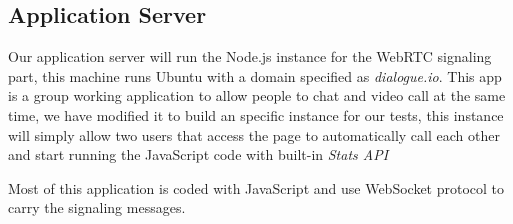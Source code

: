 \subsection{Application Server}

Our application server will run the Node.js instance for the WebRTC signaling part, this machine runs Ubuntu with a domain specified as {\it dialogue.io}. This app is a group working application to allow people to chat and video call at the same time, we have modified it to build an specific instance for our tests, this instance will simply allow two users that access the page to automatically call each other and start running the JavaScript code with built-in {\it Stats API}

Most of this application is coded with JavaScript and use WebSocket protocol to carry the signaling messages.